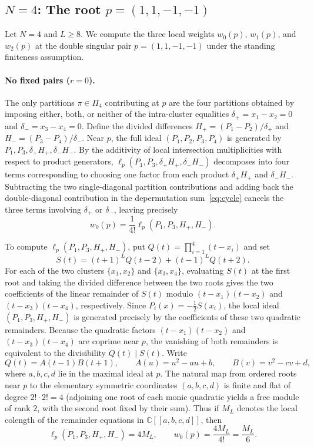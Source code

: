 \documentclass[11pt]{article}
\theoremstyle{definition}
\newcommand{\C}{\mathbb{C}}
\begin{document}
\subsection{\texorpdfstring{$N=4$}{N=4}: The root \texorpdfstring{$p=(1,1,-1,-1)$}{p=(1,1,-1,-1)}}

Let $N=4$ and $L\ge 8$. We compute the three local weights $w_0(p)$, $w_1(p)$, and $w_2(p)$ at the double singular pair $p=(1,1,-1,-1)$
under the standing finiteness assumption.

\paragraph{No fixed pairs ($r=0$).}
The only partitions $\pi\in\Pi_4$ contributing at $p$ are the four partitions obtained by imposing
either, both, or neither of the intra-cluster equalities
$\delta_+=x_1-x_2=0$ and $\delta_-=x_3-x_4=0$. Define the divided
differences $H_+=(P_1-P_2)/\delta_+$ and $H_-=(P_3-P_4)/\delta_-$.
Near $p$, the full ideal $(P_1,P_2,P_3,P_4)$ is generated by
$P_1,P_3,\delta_+H_+,\delta_-H_-$. By the additivity of local intersection
multiplicities with respect to product generators, $\ell_p(P_1,P_3,\delta_+H_+,\delta_-H_-)$ decomposes into four terms corresponding to choosing one factor from each product $\delta_+H_+$ and $\delta_-H_-$. Subtracting the two single-diagonal partition contributions and adding back the double-diagonal contribution in the depermutation sum~\eqref{eq:cycle}
cancels the three terms involving $\delta_+$ or $\delta_-$, leaving precisely
\[
 w_0(p)=\frac{1}{4!}\ell_p(P_1,P_3,H_+,H_-).
\]

To compute $\ell_p(P_1,P_3,H_+,H_-)$, put $Q(t)=\prod_{i=1}^4(t-x_i)$ and set
\[
 S(t)=(t+1)^L Q(t-2)+(t-1)^L Q(t+2).
\]
For each of the two clusters $\{x_1,x_2\}$ and $\{x_3,x_4\}$, evaluating $S(t)$ at the first root and taking the
divided difference between the two roots gives the two coefficients of the linear remainder of $S(t)$ modulo $(t-x_1)(t-x_2)$ and $(t-x_3)(t-x_4)$, respectively.
Since $P_i(x)=-\frac{1}{2}S(x_i)$, the local ideal $(P_1,P_3,H_+,H_-)$ is generated precisely by the coefficients of these two quadratic remainders. Because the quadratic factors $(t-x_1)(t-x_2)$ and $(t-x_3)(t-x_4)$
are coprime near $p$, the vanishing of both remainders is equivalent to the divisibility $Q(t)\mid S(t)$.
Write
\[
 Q(t)=A(t-1)B(t+1),\qquad
 A(u)=u^2-au+b,\qquad B(v)=v^2-cv+d,
\]
where $a,b,c,d$ lie in the maximal ideal at $p$.
The natural map from ordered roots near $p$ to the elementary symmetric coordinates $(a,b,c,d)$ is finite and flat of degree $2!\cdot 2!=4$ (adjoining one root of each monic quadratic yields a free module of rank $2$, with the second root fixed by their sum). Thus if $M_L$ denotes the
local colength of the remainder equations in $\C[[a,b,c,d]]$, then
\[
 \ell_p(P_1,P_3,H_+,H_-)=4M_L,\qquad
 w_0(p)=\frac{4M_L}{4!}=\frac{M_L}{6}.
\]
\end{document}

